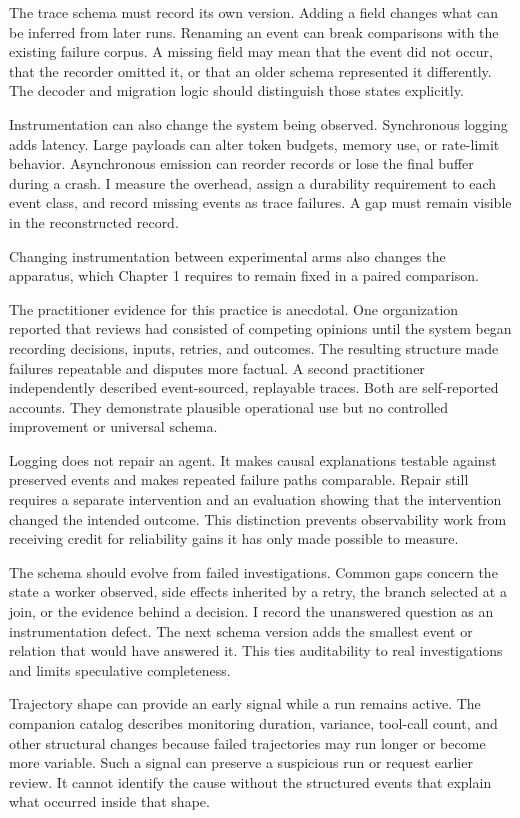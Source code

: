 The trace schema must record its own version. Adding a field changes what can be inferred from later runs. Renaming an event can break comparisons with the existing failure corpus. A missing field may mean that the event did not occur, that the recorder omitted it, or that an older schema represented it differently. The decoder and migration logic should distinguish those states explicitly.

Instrumentation can also change the system being observed. Synchronous logging adds latency. Large payloads can alter token budgets, memory use, or rate-limit behavior. Asynchronous emission can reorder records or lose the final buffer during a crash. I measure the overhead, assign a durability requirement to each event class, and record missing events as trace failures. A gap must remain visible in the reconstructed record.

Changing instrumentation between experimental arms also changes the apparatus, which Chapter 1 requires to remain fixed in a paired comparison.

The practitioner evidence for this practice is anecdotal. One organization reported that reviews had consisted of competing opinions until the system began recording decisions, inputs, retries, and outcomes. The resulting structure made failures repeatable and disputes more factual. A second practitioner independently described event-sourced, replayable traces. Both are self-reported accounts. They demonstrate plausible operational use but no controlled improvement or universal schema.

Logging does not repair an agent. It makes causal explanations testable against preserved events and makes repeated failure paths comparable. Repair still requires a separate intervention and an evaluation showing that the intervention changed the intended outcome. This distinction prevents observability work from receiving credit for reliability gains it has only made possible to measure.

The schema should evolve from failed investigations. Common gaps concern the state a worker observed, side effects inherited by a retry, the branch selected at a join, or the evidence behind a decision. I record the unanswered question as an instrumentation defect. The next schema version adds the smallest event or relation that would have answered it. This ties auditability to real investigations and limits speculative completeness.

Trajectory shape can provide an early signal while a run remains active. The companion catalog describes monitoring duration, variance, tool-call count, and other structural changes because failed trajectories may run longer or become more variable. Such a signal can preserve a suspicious run or request earlier review. It cannot identify the cause without the structured events that explain what occurred inside that shape.

